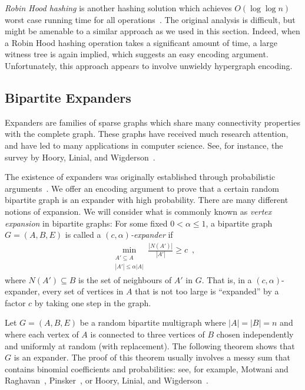 \documentclass[prodmode,acmcsur]{acmsmall}
\begin{document}
\begin{rem}
  \emph{Robin Hood hashing} is another hashing solution which achieves
  $O(\log \log n)$ worst case running time for all
  operations~\cite{devroye:robin}. The original analysis is difficult,
  but might be amenable to a similar approach as we used in
  this section. Indeed, when a Robin Hood hashing operation takes a
  significant amount of time, a large witness tree is again implied,
  which suggests an easy encoding argument. Unfortunately, this
  approach appears to involve unwieldy hypergraph encoding.
\end{rem}


\subsection{Bipartite Expanders}

Expanders are families of sparse graphs which share many connectivity
properties with the complete graph. These
graphs have received much research attention, and have led to many
applications in computer science. See, for instance, the survey by
Hoory, Linial, and Wigderson~\cite{hoory.linial.ea:expander}.

The existence of expanders was originally
established through probabilistic arguments~\cite{pinsker:expanders}.
We offer an encoding argument to prove that a certain random bipartite
graph is an expander with high probability. There are many different
notions of expansion. We will consider what is commonly known as
\emph{vertex expansion} in bipartite graphs: For some fixed
$0 < \alpha \leq 1$, a bipartite graph $G = (A, B, E)$ is called a
\emph{$(c, \alpha)$-expander} if
\begin{align*}
  \min_{\substack{{A' \subseteq A}\\{|A'| \leq \alpha |A|}}} \frac{|N(A')|}{|A'|} \geq c \enspace ,
\end{align*}
where $N(A') \subseteq B$ is the set of neighbours of $A'$ in $G$.
That is, in a $(c, \alpha)$-expander, every set  of vertices in
$A$ that is not too large is ``expanded'' by a factor $c$ by taking
one step in the graph.

Let $G = (A, B, E)$ be a random bipartite multigraph where
$|A| = |B| = n$ and where each vertex of $A$ is connected to three
vertices of $B$ chosen independently and uniformly at random (with
replacement). The following theorem shows that $G$ is an expander.
The proof of this theorem usually involves a messy sum that contains
binomial coefficients and probabilities: see, for example, Motwani and
Raghavan~\cite[Theorem~5.3]{motwani.raghavan:randomized},
Pinsker~\cite[Lemma~1]{pinsker:expanders}, or Hoory, Linial, and
Wigderson~\cite[Lemma~1.9]{hoory.linial.ea:expander}.
\end{document}
